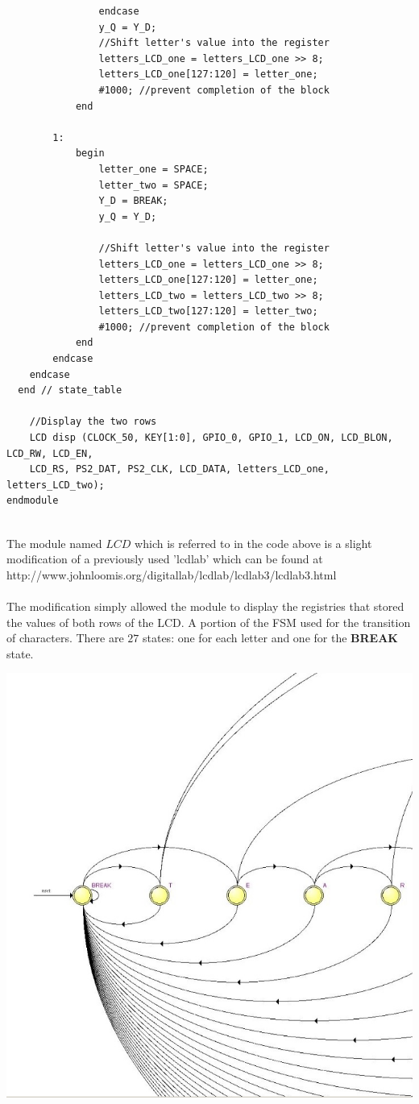\documentclass[12pt, letterpaper, english]{article}
\begin{document}
\begin{lstlisting}
				endcase
				y_Q = Y_D;
				//Shift letter's value into the register
				letters_LCD_one = letters_LCD_one >> 8;
				letters_LCD_one[127:120] = letter_one;
				#1000; //prevent completion of the block
			end
			
		1: 
			begin
				letter_one = SPACE;
				letter_two = SPACE;
				Y_D = BREAK;
				y_Q = Y_D;
				
				//Shift letter's value into the register
				letters_LCD_one = letters_LCD_one >> 8;
				letters_LCD_one[127:120] = letter_one;
				letters_LCD_two = letters_LCD_two >> 8;
				letters_LCD_two[127:120] = letter_two;
				#1000; //prevent completion of the block
			end
		endcase
	endcase 
  end // state_table
	
	//Display the two rows
	LCD disp (CLOCK_50, KEY[1:0], GPIO_0, GPIO_1, LCD_ON, LCD_BLON, LCD_RW, LCD_EN,
	LCD_RS, PS2_DAT, PS2_CLK, LCD_DATA, letters_LCD_one, letters_LCD_two);
endmodule


\end{lstlisting}
The module named $LCD$ which is referred to in the code above is a slight modification of a previously used 'lcdlab' which can be found at\\ http://www.johnloomis.org/digitallab/lcdlab/lcdlab3/lcdlab3.html\\\\
The modification simply allowed the module to display the registries that stored the values of both rows of the LCD.\newpage
\noindent A portion of the FSM used for the transition of characters. There are $27$ states: one for each letter and one for the \textbf{BREAK} state.
\begin{center}
\includegraphics[scale=0.85]{Short.jpg}
\end{center}
\end{document}
